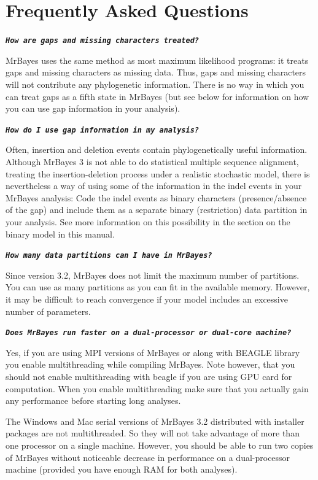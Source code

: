 \documentclass[12pt]{book}
\newcommand{\tb}[1]{\texttt{\textbf{#1}} }
\begin{document}
\section{Frequently Asked Questions}
\label{FAQ}

\tb{\it{How are gaps and missing characters treated?}}

MrBayes uses the same method as most maximum likelihood programs: it treats gaps and
missing characters as missing data. Thus, gaps and missing characters will not contribute
any phylogenetic information. There is no way in which you can treat gaps as a fifth state
in MrBayes (but see below for information on how you can use gap information in your
analysis).

\tb{\it{How do I use gap information in my analysis?}}

Often, insertion and deletion events contain phylogenetically useful information.
Although MrBayes 3 is not able to do statistical multiple sequence alignment, treating the
insertion-deletion process under a realistic stochastic model, there is nevertheless a way
of using some of the information in the indel events in your MrBayes analysis: Code the
indel events as binary characters (presence/absence of the gap) and include them as a
separate binary (restriction) data partition in your analysis. See more information on this
possibility in the section on the binary model in this manual.

\tb{\it{How many data partitions can I have in MrBayes?}}

Since version 3.2, MrBayes does not limit the maximum number of partitions. You can
use as many partitions as you can fit in the available memory. However, it may be
difficult to reach convergence if your model includes an excessive number of
parameters.

\tb{\it{Does MrBayes run faster on a dual-processor or dual-core machine?}}

Yes, if you are using MPI versions of MrBayes or along with BEAGLE library you
enable multithreading while compiling MrBayes. Note however, that you should not 
enable multithreading with beagle if you are using GPU card for computation. When
you enable multithreading make sure that you actually gain any performance before
starting long analyses.

The Windows and Mac serial versions
of MrBayes 3.2 distributed with installer packages are not multithreaded. So they will
not take advantage of more than one processor on a single machine. However, you should
be able to run two copies of MrBayes without noticeable decrease in performance on a
dual-processor machine (provided you have enough RAM for both analyses).
\end{document}
